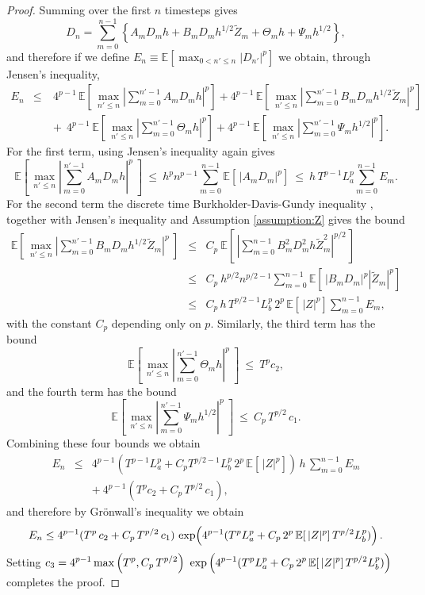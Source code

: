 \documentclass[11pt]{article}
\def \EE {{\mathbb{E}}}
\def \tZ {{\widetilde{Z}}}
\begin{document}
\begin{proof}
Summing over the first $n$ timesteps gives
\[
D_n = \sum_{m=0}^{n-1} 
\left\{  A_m D_m h + B_m D_m h^{1/2} \tZ_m + \Theta_m h + \Psi_m h^{1/2}\right\},
\]
and therefore if we define 
$\displaystyle E_n \equiv \EE\left[\max_{0< n'\leq n}|D_{n'}|^p \right]$ we obtain,
through Jensen's inequality,
\begin{eqnarray*}
E_n &\leq& 
~ 4^{p-1}\, \EE\left[ \,\max_{n'\leq n} \left| \sum_{m=0}^{n'-1}  A_m D_m h \right|^p\right]
+ 4^{p-1}\, \EE\left[ \,\max_{n'\leq n} \left| \sum_{m=0}^{n'-1}  B_m D_m h^{1/2} \tZ_m \right|^p\right]
\\ && \!\!\!\!
+\ 4^{p-1}\, \EE\left[ \,\max_{n'\leq n}  \left| \sum_{m=0}^{n'-1}  \Theta_m h \right|^p\right]
+ 4^{p-1}\, \EE\left[ \,\max_{n'\leq n} \left| \sum_{m=0}^{n'-1}  \Psi_m h^{1/2} \right|^p\right].
\end{eqnarray*}
For the first term, using Jensen's inequality again gives
\[
\EE\left[ \, \max_{n'\leq n} \left| \sum_{m=0}^{n'-1}  A_m D_m h \right|^p\ \right]
\ \leq\ h^p n^{p-1} \sum_{m=0}^{n-1} \EE\left[ \,| A_m D_m |^p \right]
\ \leq\  h\, T^{p-1} L_a^p \sum_{m=0}^{n-1} E_m.
\]
For the second term the discrete time Burkholder-Davis-Gundy 
inequality \cite{bdg72}, together with Jensen's inequality and
Assumption \ref{assumption:Z} gives the bound
\begin{eqnarray*}
\EE\left[ \, \max_{n'\leq n} \left| \sum_{m=0}^{n'-1}  B_m D_m h^{1/2} \tZ_m \right|^p\ \right]
&\leq& C_p\ \EE\left[ \,\left| \sum_{m=0}^{n-1} B^2_m D^2_m h \tZ_m^2 \right|^{p/2}\, \right]
\\
&\leq& C_p\ h^{p/2} n^{p/2-1} \sum_{m=0}^{n-1} \EE\left[ \,| B_m D_m|^p |\tZ_m|^p  \right]
\\
&\leq& C_p\, h\, T^{p/2-1} L_b^p\, 2^p\, \EE[\,|Z|^p] \sum_{m=0}^{n-1} E_m,
\end{eqnarray*}
with the constant $C_p$ depending only on $p$.
Similarly, the third term has the bound
\[
\EE\left[ \, \max_{n'\leq n} \left| \sum_{m=0}^{n'-1}  \Theta_m h \right|^p\ \right]
\ \leq\  T^p c_2,
\]
and the fourth term has the bound
\[
\EE\left[ \, \max_{n'\leq n} \left| \sum_{m=0}^{n'-1}  \Psi_m h^{1/2} \right|^p\ \right]
\ \leq\ C_p\,  T^{p/2}  \, c_1.
\]
Combining these four bounds we obtain
\begin{eqnarray*}
E_n &\leq& 4^{p-1} \left(T^{p-1} L_a^p  + C_p T^{p/2-1} L_b^p\, 2^p\, \EE[\,|Z|^p] \right)
\, h\, \sum_{m=0}^{n-1} E_m
\\ && +\ 4^{p-1} \left( T^p c_2 + C_p\, T^{p/2}\, c_1\right),
\end{eqnarray*}
and therefore by Gr\"onwall's inequality we obtain
\[
E_n \leq  4^{p-1} ( T^p\, c_2 + C_p\,  T^{p/2}\, c_1)\,
\exp\!\left(\rule{0in}{0.14in}4^{p-1} (T^p L_a^p  + C_p\, 2^p\, \EE[\,|Z|^p] \, T^{p/2} L_b^p)\right).
\]
Setting
$\displaystyle
c_3 = 4^{p-1} \max\left( T^p, C_p\, T^{p/2}\right) \ 
\exp\left(\rule{0in}{0.16in}4^{p-1} (T^p L_a^p  + C_p\, 2^p\, \EE[\,|Z|^p] \, T^{p/2} L_b^p)\right)
$
completes the proof.
\end{proof}
\end{document}
